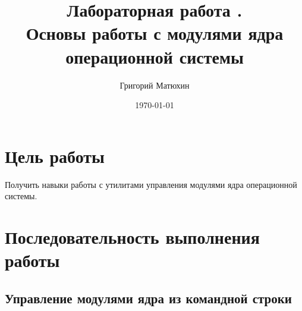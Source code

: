 \documentclass[12pt]{article}
\author{Григорий Матюхин}
\date{\today}
\title{Лабораторная работа \textnumero10.\\Основы работы с модулями ядра операционной системы}
\begin{document}
\maketitle
\newpage
\tableofcontents
\newpage
\section{Цель работы}
Получить навыки работы с утилитами управления модулями ядра операционной системы.

\section{Последовательность выполнения работы}
\subsection{Управление модулями ядра из командной строки}
\end{document}
